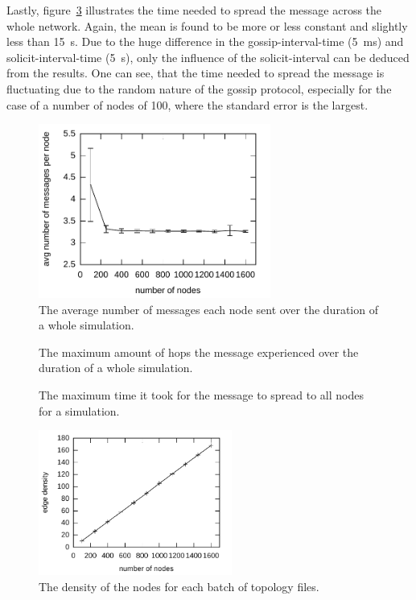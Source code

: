 \documentclass[12pt,journal]{IEEEtran}
\begin{document}
Lastly, figure~\ref{fig:maxtime} illustrates the time needed to spread the message across the whole network. Again, the mean is found to be more or less constant and slightly less than 15~s. Due to the huge difference in the gossip-interval-time (5~ms) and solicit-interval-time (5~s), only the influence of the solicit-interval can be deduced from the results. One can see, that the time needed to spread the message is fluctuating due to the random nature of the gossip protocol, especially for the case of a number of nodes of 100, where the standard error is the largest.

\begin{figure}
 \centering
 \includegraphics[width=3in]{figs/avgmsg}
 \caption{The average number of messages each node sent over the duration of a whole simulation.}
 \label{fig:avgmsg}
\end{figure}

\begin{figure}
 \centering
 \caption{The maximum amount of hops the message experienced over the duration of a whole simulation.}
 \label{fig:maxhops}
\end{figure}

\begin{figure}
 \centering
 \caption{The maximum time it took for the message to spread to all nodes for a simulation.}
 \label{fig:maxtime}
\end{figure}

\begin{figure}
 \centering
 \includegraphics[width=2.5in]{figs/density}
 \caption{The density of the nodes for each batch of topology files.}
 \label{fig:density}
\end{figure}
\end{document}
